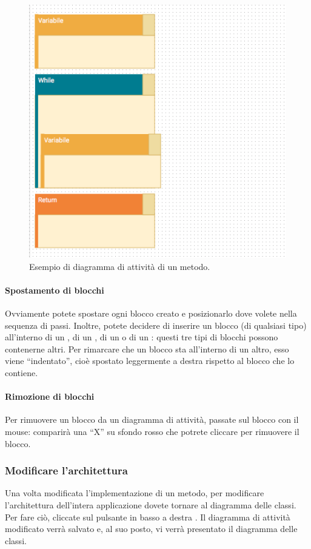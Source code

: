 \begin{figure}[h]
\centering
	\includegraphics[scale=0.4]{img/algorithm}
	\caption{Esempio di diagramma di attività di un metodo.}
	\label{fig:algorithm}
\end{figure}

\paragraph{Spostamento di blocchi} Ovviamente potete spostare ogni blocco creato e posizionarlo dove volete nella sequenza di passi. Inoltre, potete decidere di inserire un blocco (di qualsiasi tipo) all'interno di un , di un , di un  o di un : questi tre tipi di blocchi possono contenerne altri. Per rimarcare che un blocco sta all'interno di un altro, esso viene “indentato”, cioè spostato leggermente a destra rispetto al blocco che lo contiene.

\paragraph{Rimozione di blocchi} Per rimuovere un blocco da un diagramma di attività, passate sul blocco con il mouse: comparirà una “X” su sfondo rosso che potrete cliccare per rimuovere il blocco.

\subsubsection{Modificare l'architettura}
Una volta modificata l'implementazione di un metodo, per modificare l'architettura dell'intera applicazione dovete tornare al diagramma delle classi. Per fare ciò, cliccate sul pulsante in basso a destra . Il diagramma di attività modificato verrà salvato e, al suo posto, vi verrà presentato il diagramma delle classi.

